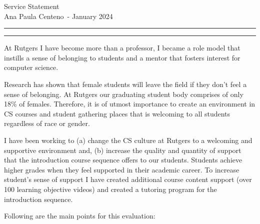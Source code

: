\documentclass[11pt]{article}
\newcommand{\soptitle}{Service Statement}
\newcommand{\yourname}{Ana Paula Centeno}
\begin{document}
\begin{center}\LARGE\soptitle\\
\large \yourname\ - January 2024
\end{center}

\hrule
\vspace{1pt}
\hrule height 1pt

\bigskip
\bigskip

At Rutgers I have become more than a professor, I became a role model
that instills a sense of belonging to students and a mentor that
fosters interest for computer science.

Research has shown that female students will leave the field if they
don't feel a sense of belonging.  At Rutgers our graduating student
body comprises of only 18\% of females. Therefore, it is of utmost
importance to create an environment in CS courses and student
gathering places that is welcoming to all students regardless of race
or gender.

I have been working to (a) change the CS culture at Rutgers to a
welcoming and supportive environment and, (b) increase the quality and
quantity of support that the introduction course sequence offers to our
students. Students achieve higher grades when they feel supported in
their academic career. To increase student's sense of support I have
created additional course content support (over 100 learning objective
videos) and created a tutoring program for the introduction sequence.

Following are the main points for this evaluation:

\bigskip
\end{document}
